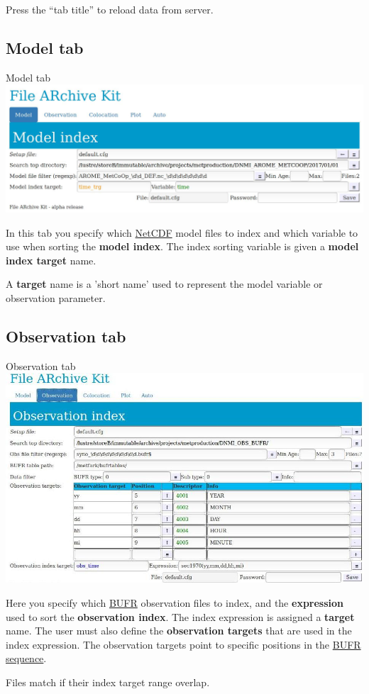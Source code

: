 \documentclass[letterpaper,10pt,twoside,twocolumn,openany]{book}
\begin{document}
\begin{quotebox}
Press the ``tab title'' to reload data from server.
\end{quotebox}

\subsection{Model tab}

\begin{paperbox}{Model tab}
  \includegraphics[width=\columnwidth]{fark_model.jpg}
\end{paperbox}
In this tab you specify which \hyperlink{netcdf}{NetCDF} model files to index and which variable to use when sorting the  {\bf model index}.
The index sorting variable is given a {\bf model index target} name.

\begin{quotebox}
  A {\bf target} name is a 'short name' used to
  represent the model variable or observation 
  parameter.
\end{quotebox}

\subsection{Observation tab}
\begin{paperbox}{Observation tab}
  \includegraphics[width=\columnwidth]{fark_obs.jpg}
\end{paperbox}
Here you specify which \hyperlink{bufr}{BUFR} observation files to index, and 
the {\bf expression} used to sort the {\bf observation index}.
The index expression is assigned a {\bf target} name. The user must also define the {\bf observation targets} that are used in the index expression. The observation targets point to specific positions in the \hyperlink{sequence}{BUFR sequence}.
\begin{quotebox}
Files match if their index target range overlap.
\end{quotebox}
\end{document}
